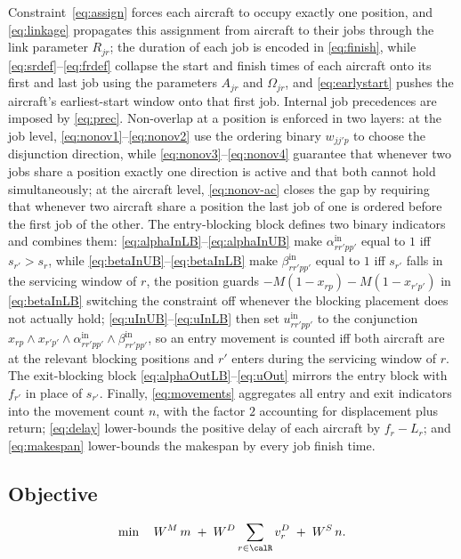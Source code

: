 Constraint~\eqref{eq:assign} forces each aircraft to occupy exactly one
position, and \eqref{eq:linkage} propagates this assignment from aircraft
to their jobs through the link parameter $R_{jr}$; the duration of each
job is encoded in \eqref{eq:finish}, while
\eqref{eq:srdef}--\eqref{eq:frdef} collapse the start and finish times of
each aircraft onto its first and last job using the parameters
$A_{jr}$ and $\Omega_{jr}$, and \eqref{eq:earlystart} pushes the
aircraft's earliest-start window onto that first job.  Internal job
precedences are imposed by \eqref{eq:prec}.  Non-overlap at a position
is enforced in two layers: at the job level,
\eqref{eq:nonov1}--\eqref{eq:nonov2} use the ordering binary $w_{jj'p}$
to choose the disjunction direction, while
\eqref{eq:nonov3}--\eqref{eq:nonov4} guarantee that whenever two jobs
share a position exactly one direction is active and that both cannot
hold simultaneously; at the aircraft level, \eqref{eq:nonov-ac} closes
the gap by requiring that whenever two aircraft share a position the
last job of one is ordered before the first job of the other.  The
entry-blocking block defines two binary indicators and combines them:
\eqref{eq:alphaInLB}--\eqref{eq:alphaInUB} make
$\alpha^{\mathrm{in}}_{rr'pp'}$ equal to $1$ iff $s_{r'} > s_r$, while
\eqref{eq:betaInUB}--\eqref{eq:betaInLB} make
$\beta^{\mathrm{in}}_{rr'pp'}$ equal to $1$ iff $s_{r'}$ falls in the
servicing window of $r$, the position guards
$-M(1 - x_{rp}) - M(1 - x_{r'p'})$ in \eqref{eq:betaInLB} switching the
constraint off whenever the blocking placement does not actually hold;
\eqref{eq:uInUB}--\eqref{eq:uInLB} then set
$u^{\mathrm{in}}_{rr'pp'}$ to the conjunction
$x_{rp} \wedge x_{r'p'} \wedge \alpha^{\mathrm{in}}_{rr'pp'} \wedge
\beta^{\mathrm{in}}_{rr'pp'}$, so an entry movement is counted iff both
aircraft are at the relevant blocking positions and $r'$ enters during
the servicing window of $r$.  The exit-blocking block
\eqref{eq:alphaOutLB}--\eqref{eq:uOut} mirrors the entry block with
$f_{r'}$ in place of $s_{r'}$.  Finally, \eqref{eq:movements} aggregates
all entry and exit indicators into the movement count $n$, with the
factor $2$ accounting for displacement plus return;
\eqref{eq:delay} lower-bounds the positive delay of each aircraft by
$f_r - L_r$; and \eqref{eq:makespan} lower-bounds the makespan by every
job finish time.

\subsection*{Objective}
\begin{equation}
  \min \quad W^M\, m
         \;+\; W^D \sum_{r \in \calR} v^D_r
         \;+\; W^S\, n.
  \label{eq:milpobj}
\end{equation}


